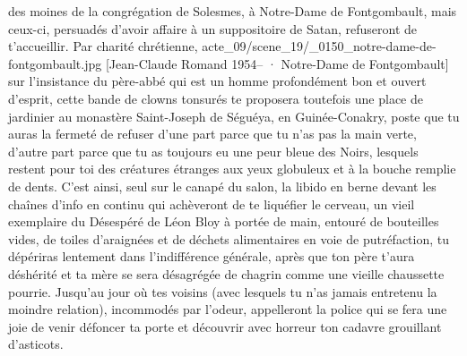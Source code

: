 des moines de la congrégation de Solesmes, à Notre-Dame de Fontgombault, mais ceux-ci, persuadés d’avoir affaire à un suppositoire de Satan, refuseront de t’accueillir. Par charité chrétienne, %
{\setlength{\onelineskip}{4pt}%
%
%
%
{acte_09/scene_19/_0150_notre-dame-de-fontgombault.jpg}%
[Jean-Claude Romand \textup{1954--} · Notre-Dame de Fontgombault]}%
\noindent sur l’insistance du père-abbé qui est un homme profondément bon et ouvert d’esprit, cette bande de clowns tonsurés te proposera toutefois une place de jardinier au monastère Saint-Joseph de Séguéya, en Guinée-Conakry, poste que tu auras la fermeté de refuser d’une part parce que tu n’as pas la main verte, d’autre part parce que tu as toujours eu une peur bleue des Noirs, lesquels restent pour toi des créatures étranges aux yeux globuleux et à la bouche remplie de dents. C’est ainsi, seul sur le canapé du salon, la libido en berne devant les chaînes d’info en continu qui achèveront de te liquéfier le cerveau, un vieil exemplaire du Désespéré de Léon Bloy à portée de main, entouré de bouteilles vides, de toiles d’araignées et de déchets alimentaires en voie de putréfaction, tu dépériras lentement dans l’indifférence générale, après que ton père t’aura déshérité et ta mère se sera désagrégée de chagrin comme une vieille chaussette pourrie. Jusqu’au jour où tes voisins (avec lesquels tu n’as jamais entretenu la moindre relation), incommodés par l’odeur, appelleront la police qui se fera une joie de venir défoncer ta porte et découvrir avec horreur ton cadavre grouillant d’asticots.
  
